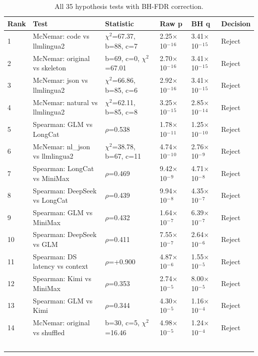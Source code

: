 \documentclass{article}
\begin{document}
\begin{table}[ht]
\centering
\scriptsize
\caption{All 35 hypothesis tests with BH-FDR correction.}
\begin{tabular}{p{0.4cm}p{3.5cm}p{2.8cm}p{1.0cm}p{1.0cm}p{0.6cm}}
\toprule
Rank & Test & Statistic & Raw p & BH q & Decision \\
\midrule
1 & McNemar: code vs llmlingua2 & $\chi$$^{2}$=67.37, b=88, c=7 & 2.25$\times$10$^{-}$$^{1}$$^{6}$ & 3.41$\times$10$^{-}$$^{1}$$^{5}$ & Reject \\
2 & McNemar: original vs skeleton & b=69, c=0, $\chi$$^{2}$=67.01 & 2.70$\times$10$^{-}$$^{1}$$^{6}$ & 3.41$\times$10$^{-}$$^{1}$$^{5}$ & Reject \\
3 & McNemar: json vs llmlingua2 & $\chi$$^{2}$=66.86, b=85, c=6 & 2.92$\times$10$^{-}$$^{1}$$^{6}$ & 3.41$\times$10$^{-}$$^{1}$$^{5}$ & Reject \\
4 & McNemar: natural vs llmlingua2 & $\chi$$^{2}$=62.11, b=85, c=8 & 3.25$\times$10$^{-}$$^{1}$$^{5}$ & 2.85$\times$10$^{-}$$^{1}$$^{4}$ & Reject \\
5 & Spearman: GLM vs LongCat & $\rho$=0.538 & 1.78$\times$10$^{-}$$^{1}$$^{1}$ & 1.25$\times$10$^{-}$$^{1}$$^{0}$ & Reject \\
6 & McNemar: nl\_json vs llmlingua2 & $\chi$$^{2}$=38.78, b=67, c=11 & 4.74$\times$10$^{-}$$^{1}$$^{0}$ & 2.76$\times$10$^{-}$$^{9}$ & Reject \\
7 & Spearman: LongCat vs MiniMax & $\rho$=0.469 & 9.42$\times$10$^{-}$$^{9}$ & 4.71$\times$10$^{-}$$^{8}$ & Reject \\
8 & Spearman: DeepSeek vs LongCat & $\rho$=0.439 & 9.94$\times$10$^{-}$$^{8}$ & 4.35$\times$10$^{-}$$^{7}$ & Reject \\
9 & Spearman: GLM vs MiniMax & $\rho$=0.432 & 1.64$\times$10$^{-}$$^{7}$ & 6.39$\times$10$^{-}$$^{7}$ & Reject \\
10 & Spearman: DeepSeek vs GLM & $\rho$=0.411 & 7.55$\times$10$^{-}$$^{7}$ & 2.64$\times$10$^{-}$$^{6}$ & Reject \\
11 & Spearman: DS latency vs context & $\rho$=+0.900 & 4.87$\times$10$^{-}$$^{6}$ & 1.55$\times$10$^{-}$$^{5}$ & Reject \\
12 & Spearman: Kimi vs MiniMax & $\rho$=0.353 & 2.74$\times$10$^{-}$$^{5}$ & 8.00$\times$10$^{-}$$^{5}$ & Reject \\
13 & Spearman: GLM vs Kimi & $\rho$=0.344 & 4.30$\times$10$^{-}$$^{5}$ & 1.16$\times$10$^{-}$$^{4}$ & Reject \\
14 & McNemar: original vs shuffled & b=30, c=5, $\chi$$^{2}$=16.46 & 4.98$\times$10$^{-}$$^{5}$ & 1.24$\times$10$^{-}$$^{4}$ & Reject \\
$$
\end{tabular}
\end{table}
\end{document}
